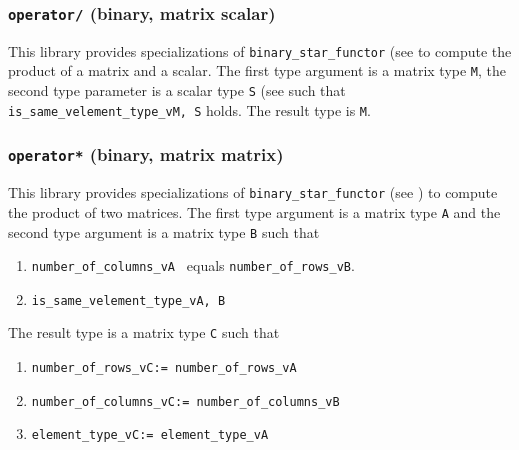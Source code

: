\documentclass[oneside]{book}
\begin{document}
\subsubsection{\texttt{operator/} (binary, matrix scalar)}
This library provides specializations of
\texttt{binary\_star\_functor}
(see \cite{arithmeticfunctors} to compute the
product of a matrix and a scalar.
The first type argument is a matrix type \texttt{M}, the second type parameter is a scalar type \texttt{S} (see \cite{mathscalars}
such that \texttt{is\_same\_v\textlangle element\_type\_v\textlangle M\textrangle, S\textrangle} holds.
The result type is \texttt{M}.

\subsubsection{\texttt{operator*} (binary, matrix matrix)}
This library provides specializations of
\texttt{binary\_star\_functor}
(see \cite{arithmeticfunctors}) to compute the
product
of two matrices. The first type argument is a matrix type \texttt{A} and the second type argument is a matrix type \texttt{B}
such that
\begin{enumerate}
	\item \texttt{number\_of\_columns\_v\textlangle A \textrangle} equals \texttt{number\_of\_rows\_v\textlangle B\textrangle}.
	\item \texttt{is\_same\_v\textlangle element\_type\_v\textlangle A, B\textrangle\textrangle}
\end{enumerate}
The result type is a matrix type \texttt{C} such that
\begin{enumerate}
	\item \texttt{number\_of\_rows\_v\textlangle C\textrangle := number\_of\_rows\_v\textlangle A\textrangle}
	\item \texttt{number\_of\_columns\_v\textlangle C\textrangle := number\_of\_columns\_v\textlangle B\textrangle}
	\item \texttt{element\_type\_v\textlangle C\textrangle := element\_type\_v\textlangle A\textrangle}
\end{enumerate}






\end{document}
